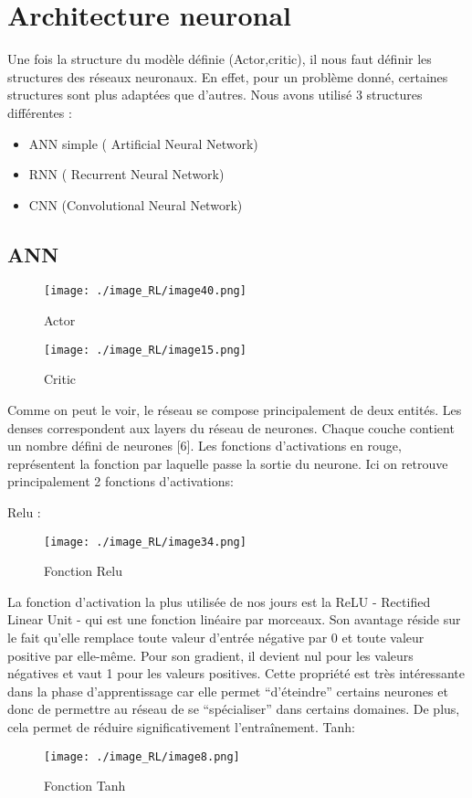 \section{Architecture neuronal}
Une fois la structure du modèle définie (Actor,critic), il nous faut définir les structures des réseaux neuronaux.
En effet, pour un problème donné, certaines structures sont plus adaptées que d’autres.
Nous avons utilisé 3 structures différentes :

\begin{itemize}
    \item ANN simple ( Artificial Neural Network)
    \item RNN ( Recurrent Neural Network)
    \item CNN (Convolutional Neural Network)
\end{itemize}

\subsection{ANN}

\begin{figure}[H]
    \centering
    \texttt{[image: ./image\_RL/image40.png]}
    \caption{Actor}
\end{figure}

\begin{figure}[H]
    \centering
    \texttt{[image: ./image\_RL/image15.png]}
    \caption{Critic}
\end{figure}

Comme on peut le voir, le réseau se compose principalement de deux entités.
Les denses correspondent aux layers du réseau de neurones. Chaque couche contient un nombre défini de neurones [6].
Les fonctions d’activations en rouge, représentent la fonction par laquelle passe la sortie du neurone.
Ici on retrouve principalement 2 fonctions d’activations:

Relu :
\begin{figure}[H]
    \centering
    \texttt{[image: ./image\_RL/image34.png]}
    \caption{Fonction Relu}
\end{figure}

La fonction d'activation la plus utilisée de nos jours est la ReLU - Rectified Linear Unit - qui est une fonction linéaire par morceaux. Son avantage réside sur le fait qu'elle remplace toute valeur d'entrée négative par 0 et toute valeur positive par elle-même. Pour son gradient, il devient nul pour les valeurs négatives et vaut 1 pour les valeurs positives. Cette propriété est très intéressante dans la phase d'apprentissage car elle permet “d’éteindre” certains neurones et donc de permettre au réseau de se “spécialiser” dans certains domaines. De plus, cela permet de réduire significativement l'entraînement.
Tanh:
\begin{figure}[H]
    \centering
    \texttt{[image: ./image\_RL/image8.png]}
    \caption{Fonction Tanh}
\end{figure}

